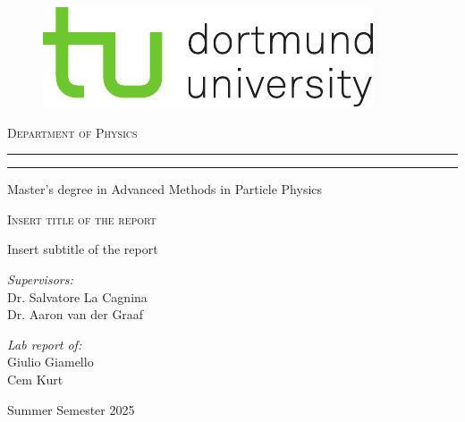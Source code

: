 \begin{titlepage}
	
	\begin{figure}[ht]
		\vspace{-0.5cm} %
		\begin{center}
			\includegraphics[scale=1.50]{tud_logos/logo_tud_english.pdf}
		\end{center}
	\end{figure}

    \vspace{15mm} %
	
	\begin{center}
		{{\large{\textsc{Department of Physics}}}}
		\rule[0.1cm]{\linewidth}{0.3mm} %
		\rule[0.5cm]{\linewidth}{0.3mm} %
		Master’s degree in Advanced Methods in Particle Physics
	\end{center}
	
	\vspace{25mm} %
	\begin{center}
		\begin{Large}
			\textsc{Insert title of the report}
		\end{Large}
        
        \vspace{5mm} %
        Insert subtitle of the report
	\end{center}
	
	\vspace{45mm} %
	\noindent
	\begin{minipage}[t]{0.47\textwidth}
		{\large{\textit{Supervisors:}
        \\ Dr. Salvatore La Cagnina
        \\ Dr. Aaron van der Graaf}}
	\end{minipage}
	\hfill
	\begin{minipage}[t]{0.47\textwidth}\raggedleft
		{\large{\textit{Lab report of:}
        \\ Giulio Giamello
        \\Cem Kurt}}
	\end{minipage}
	\vfill
	\vspace{25mm}
	\begin{center}
		{\large{Summer Semester 2025}}
	\end{center}
	\vspace{-2cm}
	
\end{titlepage}
